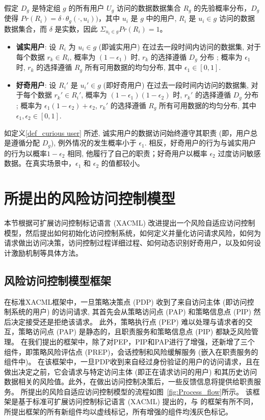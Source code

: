 \begin{definition}%
	\label{def_curious user}
	假定 $D_g$ 是特定组 $g$ 的所有用户 $U_g$ 访问的数据数据集合 $R_g$ 的先验概率分布，$D_g$ 使得 $Pr(R_i)=\delta \cdot \theta_g (\cdot,u_i))$，其中 $u_i$ 是 $g$ 中的用户, $R_i$ 是 $u_i \in g$ 访问的数据数据集合，而 $\delta$ 是实数，因此 $\Sigma_{u_i \in g}Pr(R_i) = 1$。
	\begin{itemize}
		\item \textbf{诚实用户}: 设 $R_i$ 为 $u_i \in g$ (即诚实用户) 在过去一段时间内访问的数据集, 对于每个数据 $r_k \in R_i$, 概率为 $(1-\epsilon_1)$ 时,  $r_k$ 的选择遵循 $D_g$ 分布 ; 概率为 $\epsilon_1$ 时,  $r_k$ 的选择遵循 $R_g$ 所有可用数据的均匀分布, 其中 $\epsilon_1 \in [0,1]$.
		\item \textbf{好奇用户}: 设 $R_i'$ 是 $u_i' \in g$ (即好奇用户) 在过去一段时间内访问的数据集, 对于每个数据 $r_k' \in R_i'$, 概率为 $(1-\epsilon_1)(1-\epsilon_2)$ 时,  $r_k'$ 的选择遵循 $D_g$ 分布 ; 概率为 $\epsilon_1 (1 - \epsilon_2)+ \epsilon_2$,  $r_k'$ 的选择遵循 $R_g$ 所有可用数据的均匀分布, 其中 $\epsilon_1, \epsilon_2 \in [0,1]$.
	\end{itemize}
\end{definition}

如定义\ref{def_curious user} 所述, 诚实用户的数据访问始终遵守其职责 (即，用户总是遵循分配 $D_g$), 例外情况的发生概率小于 $\epsilon_1$. 相反，好奇用户的行为与诚实用户的行为以概率$1-\epsilon_2$ 相同, 他履行了自己的职责；好奇用户以概率 $\epsilon_2$ 过度访问敏感数据。在真实场景中，$\epsilon_1$ 和 $\epsilon_2$ 的值都较小。

\section{所提出的风险访问控制模型}
\label{sec:proposed model}
本节根据可扩展访问控制标记语言 (XACML) \cite{verma2004xml} 改进提出一个风险自适应访问控制模型，然后提出如何初始化访问控制系统，如何定义并量化访问请求风险，如何为请求做出访问决策，访问控制过程详细过程、如何动态识别好奇用户，以及如何设计激励机制等具体方法。

\subsection{风险访问控制模型框架}
\label{subsec:framework}

在标准XACML框架中，一旦策略决策点 (PDP) 收到了来自访问主体 (即访问控制系统的用户) 的访问请求, 其首先会从策略访问点 (PAP) 和策略信息点 (PIP) 然后决定接受还是拒绝该请求。 此外，策略执行点 (PEP) 难以处理与请求者的交互，策略访问点 (PAP) 是静态的，且职责服务和策略信息点 (PIP) 都缺乏风险管理。
在我们提出的框架中，除了对PEP，PIP和PAP进行了增强，还新增了三个组件，即策略风险评估点 (PREP)，会话控制和风险缓解服务 (嵌入在职责服务的组件中)。 在该框架中，一旦PDP收到来自经过身份验证的用户的访问请求，且在做出决定之前，它会请求与特定访问主体 (即正在请求访问的用户) 和其历史访问数据相关的风险值。此外，在做出访问控制决策后，一些反馈信息将提供给职责服务。 所提出的风险自适应访问控制模型的流程如图~\ref{fig:Process_flow}所示。 该框架是基于标准可扩展访问控制标记语言 (XACML) 提出的，与 \cite{shaikh2012dynamic}的框架有所不同，所提出框架的所有新组件均以虚线标记，所有增强的组件均浅灰色标记。


